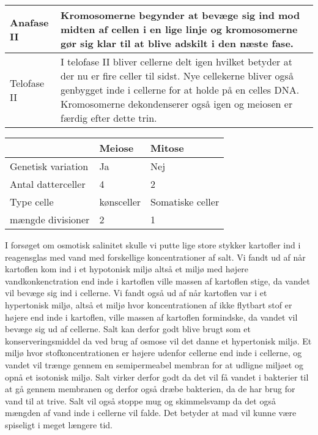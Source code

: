 \begin{longtable}{ | m{3cm} | m{14cm} |}
    Anafase II & Kromosomerne begynder at bevæge sig ind mod midten af cellen i en lige linje og kromosomerne gør sig klar til at blive adskilt i den næste fase. \\ \hline

    Telofase II & I telofase II bliver cellerne delt igen hvilket betyder at der nu er fire celler til sidst. Nye cellekerne bliver også genbygget inde i cellerne for at holde på en celles DNA. Kromosomerne dekondenserer også igen og meiosen er færdig efter dette trin. \\ \hline

\end{longtable}

\begin{longtable}{ | m{5cm} | m{5cm} | m{5cm} | }
    \hline 
    & Meiose & Mitose \\ \hline
    Genetisk variation & Ja & Nej \\ \hline
    Antal datterceller & 4 & 2 \\ \hline
    Type celle & kønsceller & Somatiske celler \\ \hline
    mængde divisioner & 2 & 1 \\ \hline
\end{longtable}

I forsøget om osmotisk salinitet skulle vi putte lige store stykker kartofler ind i reagensglas med vand med forskellige koncentrationer af salt. Vi fandt ud af når kartoflen kom ind i et hypotonisk miljø altså et miljø med højere vandkonkenctration end inde i kartoflen ville massen af kartoflen stige, da vandet vil bevæge sig ind i cellerne. Vi fandt også ud af når kartoflen var i et hypertonisk miljø, altså et miljø hvor koncentrationen af ikke flytbart stof er højere end inde i kartoflen, ville massen af kartoflen formindske, da vandet vil bevæge sig ud af cellerne.
Salt kan derfor godt blive brugt som et konserveringsmiddel da ved brug af osmose vil det danne et hypertonisk miljø. Et miljø hvor stofkoncentrationen er højere udenfor cellerne end inde i cellerne, og vandet vil trænge gennem en semipermeabel membran for at udligne miljøet og opnå et isotonisk miljø. Salt virker derfor godt da det vil få vandet i bakterier til at gå gennem membranen og derfor også dræbe bakterien, da de har brug for vand til at trive. Salt vil også stoppe mug og skimmelsvamp da det også mængden af vand inde i cellerne vil falde. Det betyder at mad vil kunne være spiseligt i meget længere tid.
